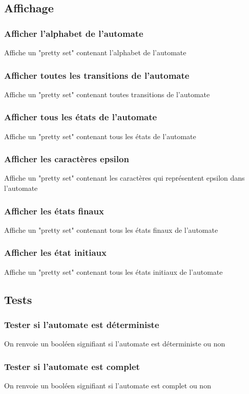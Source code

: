 \documentclass[a4paper, 12pt]{report}
\begin{document}
\subsection{Affichage}
\subsubsection*{Afficher l'alphabet de l'automate}
Affiche un "pretty set" contenant l'alphabet de l'automate
\subsubsection*{Afficher toutes les transitions de l'automate}
Affiche un "pretty set" contenant toutes transitions de l'automate
\subsubsection*{Afficher tous les états de l'automate}
Affiche un "pretty set" contenant tous les états de l'automate
\subsubsection*{Afficher les caractères epsilon}
Affiche un "pretty set" contenant les caractères qui représentent epsilon dans l'automate
\subsubsection*{Afficher les états finaux}
Affiche un "pretty set" contenant tous les états finaux de l'automate
\subsubsection*{Afficher les état initiaux}
Affiche un "pretty set" contenant tous les états initiaux de l'automate

\subsection{Tests}
\subsubsection*{Tester si l'automate est déterministe}
On renvoie un booléen signifiant si l'automate est déterministe ou non
\subsubsection*{Tester si l'automate est complet}
On renvoie un booléen signifiant si l'automate est complet ou non
\end{document}
